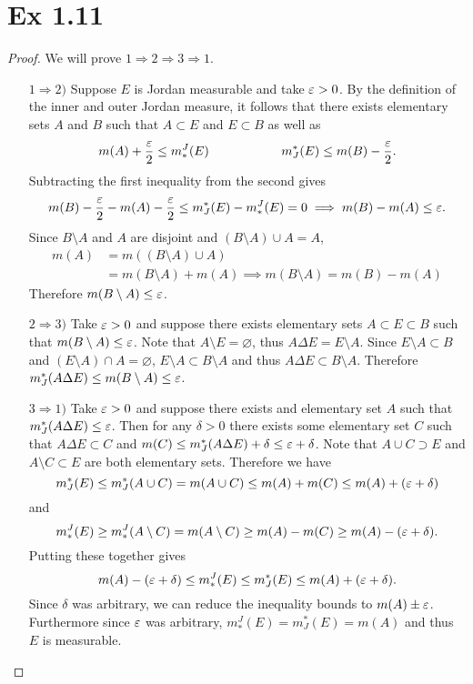 \documentclass[hw_all.tex]{subfiles}
\begin{document}
\section*{Ex 1.11}

\begin{proof}
    We will prove $1 \Rightarrow 2 \Rightarrow 3 \Rightarrow 1$. \hfill
    \begin{enumerate}
        \item[$1 \Rightarrow 2)$]
            Suppose $E$ is Jordan measurable and take $\varepsilon > 0$. By the definition of the inner and outer Jordan measure, it follows that there exists elementary sets $A$ and $B$ such that $A \subset E$ and $E \subset B$ as well as
            \[
                m(A) + \frac{\varepsilon}{2} \leq m_*^J(E) \hspace{2cm} m_J^*(E) \leq m(B) - \frac{\varepsilon}{2}
            .\]
            Subtracting the first inequality from the second gives
            \[
                m(B) - \frac{\varepsilon}{2} - m(A) - \frac{\varepsilon}{2} \leq m_J^*(E) - m^J_*(E) = 0 \implies m(B) - m(A) \leq \varepsilon
            .\]
            Since $B \setminus A$ and $A$ are disjoint and $(B \setminus A) \cup A = A$,
            \begin{align*}
                m(A) &= m((B \setminus A) \cup A) \\ 
                     &= m(B \setminus A) + m(A) \implies m(B \setminus A) = m(B) - m(A)
            \end{align*}
            Therefore $m(B \setminus A) \leq \varepsilon$.
        \item[$2 \Rightarrow 3)$]
            Take $\varepsilon > 0$ and suppose there exists elementary sets $A \subset E \subset B$ such that $m(B \setminus A) \leq \varepsilon$. Note that $A \setminus E = \varnothing$, thus $A \Delta E = E \setminus A$. Since $E \setminus A \subset B$ and $(E \setminus A) \cap A = \varnothing$, $E \setminus A \subset B \setminus A$ and thus $A \Delta E \subset B \setminus A$. Therefore $m_J^*(A \Delta E) \leq m(B \setminus A) \leq \varepsilon$.
        \item[$3 \Rightarrow 1)$]
            Take $\varepsilon > 0$ and suppose there exists and elementary set $A$ such that $m_J^*(A \Delta E) \leq \varepsilon$. Then for any $\delta > 0$ there exists some elementary set $C$ such that $A \Delta E \subset C$ and $m(C) \leq m_J^*(A \Delta E) + \delta \leq \varepsilon + \delta$. Note that $A \cup C \supset E$ and $A \setminus C \subset E$ are both elementary sets. Therefore we have
            \[
                m_J^*(E) \leq m_J^*(A \cup C) = m(A \cup C) \leq m(A) + m(C) \leq m(A) + (\varepsilon + \delta)
            \]
            and
            \[
                m^J_*(E) \geq m^J_*(A \setminus C) = m(A \setminus C) \geq m(A) - m(C) \geq m(A) - (\varepsilon + \delta)
            .\]
            Putting these together gives
            \[
                m(A) - (\varepsilon + \delta) \leq m^J_*(E) \leq m_J^*(E) \leq m(A) + (\varepsilon + \delta)
            .\]
            Since $\delta$ was arbitrary, we can reduce the inequality bounds to $m(A) \pm \varepsilon$. Furthermore since $\varepsilon$ was arbitrary, $m^J_*(E) = m_J^*(E) = m(A)$ and thus $E$ is measurable.
    \end{enumerate}
\end{proof}
\end{document}
